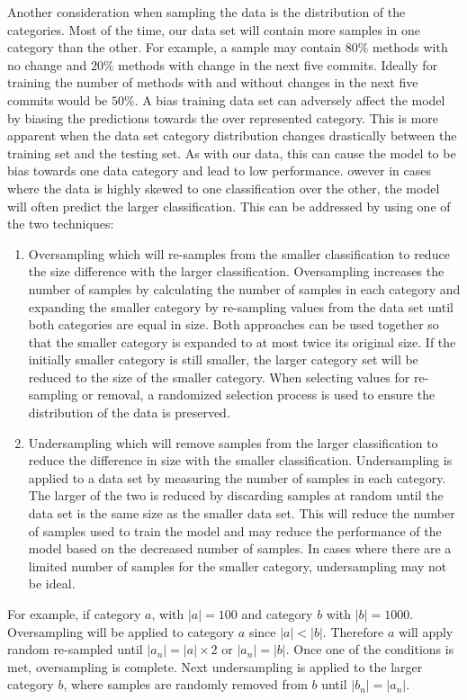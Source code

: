 Another consideration when sampling the data is the distribution of the categories. Most of the time, our data set will contain more samples in one category than the other. For example, a sample may contain $80\%$ methods with no change and $20\%$ methods with change in the next five commits. Ideally for training the number of methods with and without changes in the next five commits would be $50\%$. A bias training data set can adversely affect the model by biasing the predictions towards the over represented category. This is more apparent when the data set category distribution changes drastically between the training set and the testing set. As with our data, this can cause the model to be bias towards one data category and lead to low performance. owever in cases where the data is highly skewed to one classification over the other, the model will often predict the larger classification. This can be addressed by using one of the two techniques:
\begin{enumerate}
\item Oversampling which will re-samples from the smaller classification to reduce the size difference with the larger classification. Oversampling increases the number of samples by calculating the number of samples in each category and expanding the smaller category by re-sampling values from the data set until both categories are equal in size. Both approaches can be used together so that the smaller category is expanded to at most twice its original size. If the initially smaller category is still smaller, the larger category set will be reduced to the size of the smaller category. When selecting values for re-sampling or removal, a randomized selection process is used to ensure the distribution of the data is preserved.
\item Undersampling which will remove samples from the larger classification to reduce the difference in size with the smaller classification. Undersampling is applied to a data set by measuring the number of samples in each category. The larger of the two is reduced by discarding samples at random until the data set is the same size as the smaller data set. This will reduce the number of samples used to train the model and may reduce the performance of the model based on the decreased number of samples. In cases where there are a limited number of samples for the smaller category, undersampling may not be ideal.
\end{enumerate}
For example, if category $a$, with $|a| = 100$ and category $b$ with $|b| = 1000$. Oversampling will be applied to category $a$ since $|a| < |b|$. Therefore $a$ will apply random re-sampled until $|a_n| = |a| \times 2$ or $|a_n| = |b|$. Once one of the conditions is met, oversampling is complete. Next undersampling is applied to the larger category $b$, where samples are randomly removed from $b$ until $|b_n| = |a_n|$.

